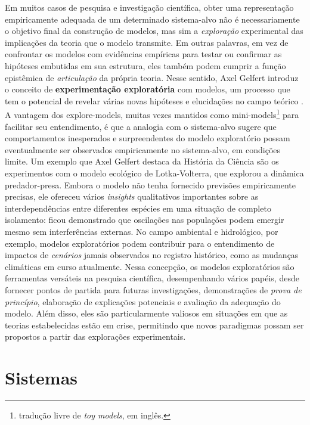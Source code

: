 \documentclass[./main.tex]{subfiles}
\begin{document}
\par Em muitos casos de pesquisa e investigação científica, obter uma representação empiricamente adequada de um determinado sistema-alvo não é necessariamente o objetivo final da construção de modelos, mas sim a \textit{exploração} experimental das implicações da teoria que o modelo transmite. Em outras palavras, em vez de confrontar os modelos com evidências empíricas para testar ou confirmar as hipóteses embutidas em sua estrutura, eles também podem cumprir a função epistêmica de \textit{articulação} da própria teoria. Nesse sentido, Axel Gelfert introduz o conceito de \textbf{experimentação exploratória} com modelos, um processo que tem o potencial de revelar várias novas hipóteses e elucidações no campo teórico \cite{gelfert2016}. A vantagem dos \gls{explore-models}, muitas vezes mantidos como \gls{mini-models}\footnote{tradução livre de \textit{toy models}, em inglês.} para facilitar seu entendimento, é que a analogia com o sistema-alvo sugere que comportamentos inesperados e surpreendentes do modelo exploratório possam eventualmente ser observados empiricamente no sistema-alvo, em condições limite. Um exemplo que Axel Gelfert destaca da História da Ciência são os experimentos com o modelo ecológico de Lotka-Volterra, que explorou a dinâmica predador-presa. Embora o modelo não tenha fornecido previsões empiricamente precisas, ele ofereceu vários \textit{insights} qualitativos importantes sobre as interdependências entre diferentes espécies em uma situação de completo isolamento: ficou demonstrado que oscilações nas populações podem emergir mesmo sem interferências externas. No campo ambiental e hidrológico, por exemplo, modelos exploratórios podem contribuir para o entendimento de impactos de \textit{cenários} jamais observados no registro histórico, como as mudanças climáticas em curso atualmente. Nessa concepção, os modelos exploratórios são ferramentas versáteis na pesquisa científica, desempenhando vários papéis, desde fornecer pontos de partida para futuras investigações, demonstrações de \textit{prova de princípio}, elaboração de explicações potenciais e avaliação da adequação do modelo. Além disso, eles são particularmente valiosos em situações em que as teorias estabelecidas estão em crise, permitindo que novos paradigmas possam ser propostos a partir das explorações experimentais.

\section{Sistemas} \label{sec:sys:systems}
\end{document}
